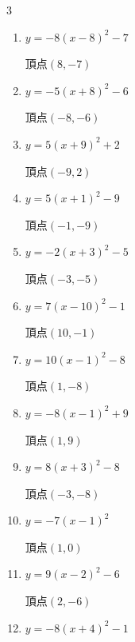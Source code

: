 \begin{multicols}{3}
\begin{enumerate}
        $\displaystyle 頂点\left( 10 , 3 \right)$

  \item $\displaystyle y=-8\left( x-8\right)^{2}-7$

        $\displaystyle 頂点\left( 8 , -7 \right)$

  \item $\displaystyle y=-5\left( x+8\right)^{2}-6$

        $\displaystyle 頂点\left( -8 , -6 \right)$

  \item $\displaystyle y=5\left( x+9\right)^{2}+2$

        $\displaystyle 頂点\left( -9 , 2 \right)$

  \item $\displaystyle y=5\left( x+1\right)^{2}-9$

        $\displaystyle 頂点\left( -1 , -9 \right)$

  \item $\displaystyle y=-2\left( x+3\right)^{2}-5$

        $\displaystyle 頂点\left( -3 , -5 \right)$

  \item $\displaystyle y=7\left( x-10\right)^{2}-1$

        $\displaystyle 頂点\left( 10 , -1 \right)$

  \item $\displaystyle y=10\left( x-1\right)^{2}-8$

        $\displaystyle 頂点\left( 1 , -8 \right)$

  \item $\displaystyle y=-8\left( x-1\right)^{2}+9$

        $\displaystyle 頂点\left( 1 , 9 \right)$

  \item $\displaystyle y=8\left( x+3\right)^{2}-8$

        $\displaystyle 頂点\left( -3 , -8 \right)$

  \item $\displaystyle y=-7\left( x-1\right)^{2}$

        $\displaystyle 頂点\left( 1 , 0 \right)$

  \item $\displaystyle y=9\left( x-2\right)^{2}-6$

        $\displaystyle 頂点\left( 2 , -6 \right)$

  \item $\displaystyle y=-8\left( x+4\right)^{2}-1$


\end{enumerate}
\end{multicols}
